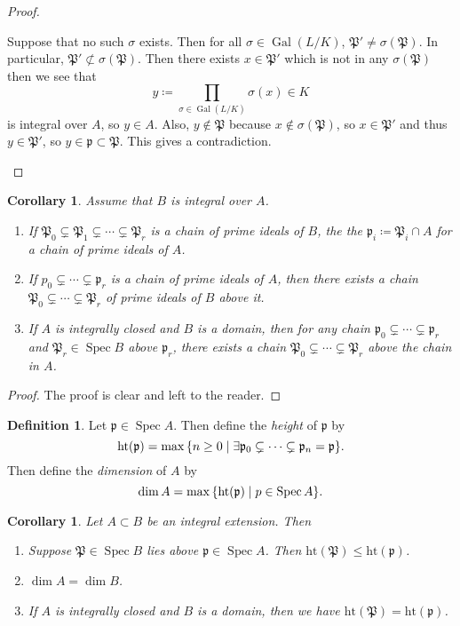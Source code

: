 \documentclass[leqno, openany]{memoir}
\newtheorem{cor}[thm]{Corollary}
\theoremstyle{definition}
\newtheorem{defn}[thm]{Definition}
\theoremstyle{remark}
\theoremstyle{plain}
\theoremstyle{definition}
\theoremstyle{remark}
\newcommand{\mf}[1]{\mathfrak{#1}}
\newcommand{\mr}[1]{\mathrm{#1}}
\DeclareMathOperator{\Gal}{Gal}
\DeclareMathOperator{\spec}{Spec}
\DeclareMathOperator{\Spec}{Spec}
\begin{document}
\begin{proof}
\begin{enumerate}
            Suppose that no such $\sigma$ exists. Then for all $\sigma \in \Gal(L/K)$, $\mf{P}' \neq \sigma(\mf{P})$. In particular, $\mf{P}' \not\subset \sigma(\mf{P})$. Then there exists $x \in \mf{P}'$ which is not in any $\sigma(\mf{P})$ then we see that
            \[ y \coloneqq \prod_{\sigma \in \Gal(L/K)} \sigma(x) \in K \]
            is integral over $A$, so $y \in A$. Also, $y \notin \mf{P}$ because $x \notin \sigma(\mf{P})$, so $x \in \mf{P}'$ and thus $y \in \mf{P}'$, so $y \in \mf{p} \subset \mf{P}$. This gives a contradiction. \qedhere
    \end{enumerate}
\end{proof}

\begin{cor}
    Assume that $B$ is integral over $A$. 
    \begin{enumerate}
        \item If $\mf{P}_0 \subsetneq \mf{P}_1 \subsetneq \cdots \subsetneq \mf{P}_r$ is a chain of prime ideals of $B$, the the $\mf{p}_i \coloneqq \mf{P}_i \cap A$ for a chain of prime ideals of $A$.
        \item If $p_0 \subsetneq \cdots \subsetneq \mf{p}_r$ is a chain of prime ideals of $A$, then there exists a chain $\mf{P}_0 \subsetneq \cdots \subsetneq \mf{P}_r$ of prime ideals of $B$ above it.
        \item If $A$ is integrally closed and $B$ is a domain, then for any chain $\mf{p}_0 \subsetneq \cdots \subsetneq \mf{p}_r$ and $\mf{P}_r \in \Spec B$ above $\mf{p}_r$, there exists a chain $\mf{P}_0 \subsetneq \cdots \subsetneq \mf{P}_r$ above the chain in $A$.
    \end{enumerate}
\end{cor}

\begin{proof}
    The proof is clear and left to the reader.
\end{proof}

\begin{defn}
    Let $\mf{p} \in \Spec A$. Then define the \textit{height}  of $\mf{p}$ by
    \[ \mr{ht}(\mf{p}) = \max \qty{n \geq 0 \mid \exists \mf{p}_0 \subsetneq \cdots \subsetneq \mf{p}_n = \mf{p}}. \]
    Then define the \textit{dimension} of $A$ by
    \[ \dim A = \max \qty{ \mr{ht}(\mf{p}) \mid p \in \Spec A }. \]
\end{defn}

\begin{cor}
    Let $A \subset B$ be an integral extension. Then
    \begin{enumerate}
        \item Suppose $\mf{P} \in \spec B$ lies above $\mf{p} \in \Spec A$. Then $\mr{ht}(\mf{P}) \leq \mr{ht}(\mf{p})$.
        \item $\dim A = \dim B$.
        \item If $A$ is integrally closed and $B$ is a domain, then we have $\mr{ht}(\mf{P}) = \mr{ht}(\mf{p})$. 
    \end{enumerate}
\end{cor}
\end{document}
